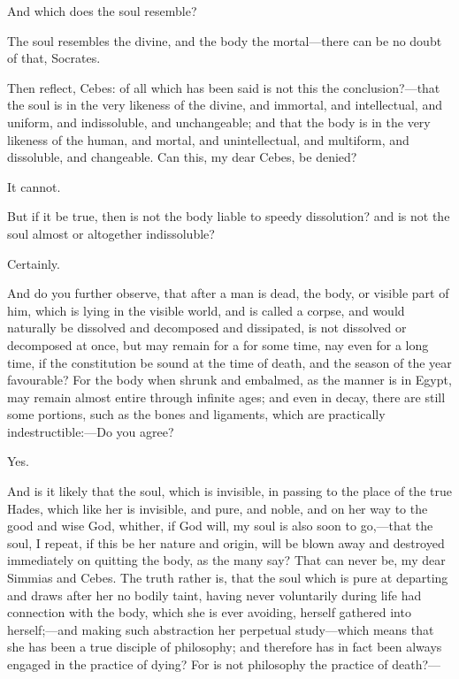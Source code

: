 \documentclass[11pt,letter]{article}
\begin{document}
\par  And which does the soul resemble?

\par  The soul resembles the divine, and the body the mortal—there can be no doubt of that, Socrates.

\par  Then reflect, Cebes: of all which has been said is not this the conclusion?—that the soul is in the very likeness of the divine, and immortal, and intellectual, and uniform, and indissoluble, and unchangeable; and that the body is in the very likeness of the human, and mortal, and unintellectual, and multiform, and dissoluble, and changeable. Can this, my dear Cebes, be denied?

\par  It cannot.

\par  But if it be true, then is not the body liable to speedy dissolution? and is not the soul almost or altogether indissoluble?

\par  Certainly.

\par  And do you further observe, that after a man is dead, the body, or visible part of him, which is lying in the visible world, and is called a corpse, and would naturally be dissolved and decomposed and dissipated, is not dissolved or decomposed at once, but may remain for a for some time, nay even for a long time, if the constitution be sound at the time of death, and the season of the year favourable? For the body when shrunk and embalmed, as the manner is in Egypt, may remain almost entire through infinite ages; and even in decay, there are still some portions, such as the bones and ligaments, which are practically indestructible:—Do you agree?

\par  Yes.

\par  And is it likely that the soul, which is invisible, in passing to the place of the true Hades, which like her is invisible, and pure, and noble, and on her way to the good and wise God, whither, if God will, my soul is also soon to go,—that the soul, I repeat, if this be her nature and origin, will be blown away and destroyed immediately on quitting the body, as the many say? That can never be, my dear Simmias and Cebes. The truth rather is, that the soul which is pure at departing and draws after her no bodily taint, having never voluntarily during life had connection with the body, which she is ever avoiding, herself gathered into herself;—and making such abstraction her perpetual study—which means that she has been a true disciple of philosophy; and therefore has in fact been always engaged in the practice of dying? For is not philosophy the practice of death?—
\end{document}
